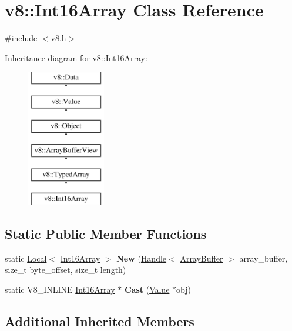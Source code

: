 \hypertarget{classv8_1_1Int16Array}{\section{v8\-:\-:Int16\-Array Class Reference}
\label{classv8_1_1Int16Array}
}


{\ttfamily \#include $<$v8.\-h$>$}

Inheritance diagram for v8\-:\-:Int16\-Array\-:\begin{figure}[H]
\begin{center}
\leavevmode
\includegraphics[height=6.000000cm]{classv8_1_1Int16Array}
\end{center}
\end{figure}
\subsection*{Static Public Member Functions}
\begin{DoxyCompactItemize}
\item 
\hypertarget{classv8_1_1Int16Array_adc49fddf7e0b2c719085f5f9af3762e5}{static \hyperlink{classv8_1_1Local}{Local}$<$ \hyperlink{classv8_1_1Int16Array}{Int16\-Array} $>$ {\bfseries New} (\hyperlink{classv8_1_1Handle}{Handle}$<$ \hyperlink{classv8_1_1ArrayBuffer}{Array\-Buffer} $>$ array\-\_\-buffer, size\-\_\-t byte\-\_\-offset, size\-\_\-t length)}\label{classv8_1_1Int16Array_adc49fddf7e0b2c719085f5f9af3762e5}

\item 
\hypertarget{classv8_1_1Int16Array_abef12f11ace9c74a4ce451db28b954e5}{static V8\-\_\-\-I\-N\-L\-I\-N\-E \hyperlink{classv8_1_1Int16Array}{Int16\-Array} $\ast$ {\bfseries Cast} (\hyperlink{classv8_1_1Value}{Value} $\ast$obj)}\label{classv8_1_1Int16Array_abef12f11ace9c74a4ce451db28b954e5}

\end{DoxyCompactItemize}
\subsection*{Additional Inherited Members}


